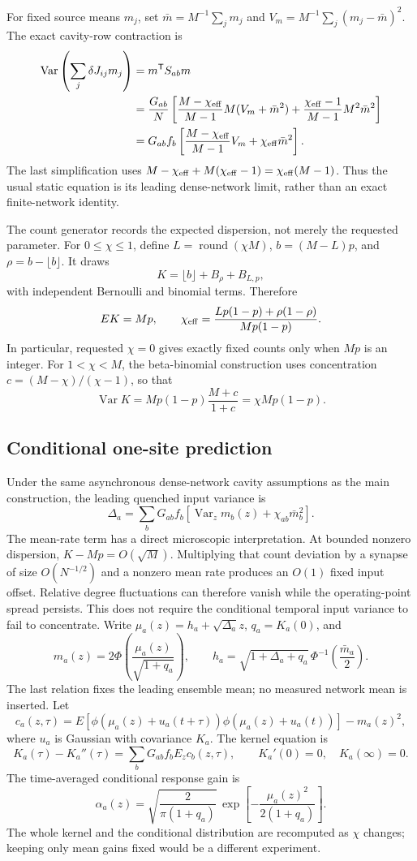 For fixed source means \(m_j\), set
\(\bar m=M^{-1}\sum_jm_j\) and
\(V_m=M^{-1}\sum_j(m_j-\bar m)^2\). The exact cavity-row contraction is
\begin{align*}
 \operatorname{Var}\left(\sum_j\delta J_{ij}m_j\right)
 &=m^{\mathsf T}S_{ab}m\\
 &=\frac{G_{ab}}N\left[
 \frac{M-\chi_{\rm eff}}{M-1}M(V_m+\bar m^2)
 +\frac{\chi_{\rm eff}-1}{M-1}M^2\bar m^2\right]\\
 &=G_{ab}f_b\left[
 \frac{M-\chi_{\rm eff}}{M-1}V_m+\chi_{\rm eff}\bar m^2
 \right].
\end{align*}
The last simplification uses
\(M-\chi_{\rm eff}+M(\chi_{\rm eff}-1)=\chi_{\rm eff}(M-1)\).
Thus the usual static equation is its leading dense-network limit, rather
than an exact finite-network identity.

The count generator records the expected dispersion, not merely the
requested parameter. For \(0\le\chi\le1\), define
\(L=\operatorname{round}(\chi M)\),
\(b=(M-L)p\), and \(\rho=b-\lfloor b\rfloor\). It draws
\[
 K=\lfloor b\rfloor+B_\rho+B_{L,p},
\]
with independent Bernoulli and binomial terms. Therefore
\[
 E K=Mp,\qquad
 \chi_{\rm eff}
 =\frac{L p(1-p)+\rho(1-\rho)}{Mp(1-p)}.
\]
In particular, requested \(\chi=0\) gives exactly fixed counts only when
\(Mp\) is an integer. For \(1<\chi<M\), the beta-binomial construction uses
concentration \(c=(M-\chi)/(\chi-1)\), so that
\[
 \operatorname{Var}K
 =Mp(1-p)\frac{M+c}{1+c}
 =\chi Mp(1-p).
\]

\subsection{Conditional one-site prediction}

Under the same asynchronous dense-network cavity assumptions as the main
construction, the leading quenched input variance is
\[
 \Delta_a=\sum_bG_{ab}f_b
 \left[\operatorname{Var}_z m_b(z)+\chi_{ab}\bar m_b^2\right].
\]
The mean-rate term has a direct microscopic interpretation. At bounded
nonzero dispersion, \(K-Mp=O(\sqrt M)\). Multiplying that count deviation
by a synapse of size \(O(N^{-1/2})\) and a nonzero mean rate produces an
\(O(1)\) fixed input offset. Relative degree fluctuations can therefore
vanish while the operating-point spread persists. This does not require
the conditional temporal input variance to fail to concentrate.
Write \(\mu_a(z)=h_a+\sqrt{\Delta_a}z\),
\(q_a=K_a(0)\), and
\[
 m_a(z)=2\Phi\!\left(\frac{\mu_a(z)}{\sqrt{1+q_a}}\right),
 \qquad
 h_a=\sqrt{1+\Delta_a+q_a}\,
       \Phi^{-1}\!\left(\frac{\bar m_a}{2}\right).
\]
The last relation fixes the leading ensemble mean; no measured network mean
is inserted. Let
\[
 c_a(z,\tau)=
 E[\phi(\mu_a(z)+u_a(t+\tau))\phi(\mu_a(z)+u_a(t))]
 -m_a(z)^2,
\]
where \(u_a\) is Gaussian with covariance \(K_a\). The kernel equation is
\[
 K_a(\tau)-K_a''(\tau)
 =\sum_bG_{ab}f_b E_z c_b(z,\tau),
 \qquad K_a'(0)=0,\quad K_a(\infty)=0.
\]
The time-averaged conditional response gain is
\[
 \alpha_a(z)=
 \sqrt{\frac{2}{\pi(1+q_a)}}\,
 \exp\!\left[-\frac{\mu_a(z)^2}{2(1+q_a)}\right].
\]
The whole kernel and the conditional distribution are recomputed as
\(\chi\) changes; keeping only mean gains fixed would be a different
experiment.

